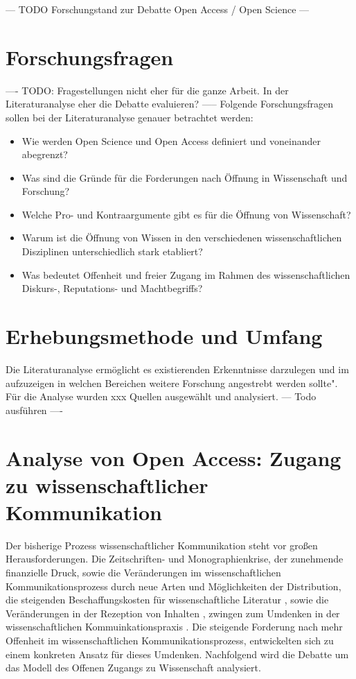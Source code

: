 --- TODO Forschungstand zur Debatte Open Access / Open Science ---

\section{Forschungsfragen} 

---- TODO: Fragestellungen nicht eher für die ganze Arbeit. In der Literaturanalyse eher die Debatte evaluieren? -----
Folgende Forschungsfragen sollen bei der Literaturanalyse genauer betrachtet werden:
\begin{itemize}
\item Wie werden Open Science und Open Access definiert und voneinander abegrenzt? 
\item Was sind die Gründe für die Forderungen nach Öffnung in Wissenschaft und Forschung? 
\item Welche Pro- und Kontraargumente gibt es für die Öffnung von Wissenschaft? 
\item Warum ist die Öffnung von Wissen in den verschiedenen wissenschaftlichen Disziplinen unterschiedlich stark etabliert? 
\item Was bedeutet Offenheit und freier Zugang im Rahmen des wissenschaftlichen Diskurs-, Reputations- und Machtbegriffs?
\end{itemize}	

\section{Erhebungsmethode und Umfang} 

Die Literaturanalyse ermöglicht es existierenden Erkenntnisse darzulegen und im aufzuzeigen in welchen Bereichen weitere Forschung angestrebt werden sollte"\cite{webster2002analyzing}. Für die Analyse wurden xxx Quellen ausgewählt und analysiert. --- Todo ausführen ----

\section{Analyse von Open Access: Zugang zu wissenschaftlicher Kommunikation} 

Der bisherige Prozess wissenschaftlicher Kommunikation steht vor großen Herausforderungen. Die Zeitschriften- und Monographienkrise, der zunehmende finanzielle Druck, sowie die Veränderungen im wissenschaftlichen Kommunikationsprozess durch neue Arten und Möglichkeiten der Distribution, die steigenden Beschaffungskosten für wissenschaftliche Literatur \cite{cite:17}, sowie die Veränderungen in der Rezeption von Inhalten \cite{holub_2013_reception}, zwingen zum Umdenken in der wissenschaftlichen Kommuinkationspraxis \cite{suchen}. Die steigende Forderung nach mehr Offenheit im wissenschaftlichen Kommunikationsprozess, entwickelten sich zu einem konkreten Ansatz für dieses Umdenken. Nachfolgend wird die Debatte um das Modell des Offenen Zugangs zu Wissenschaft analysiert.

